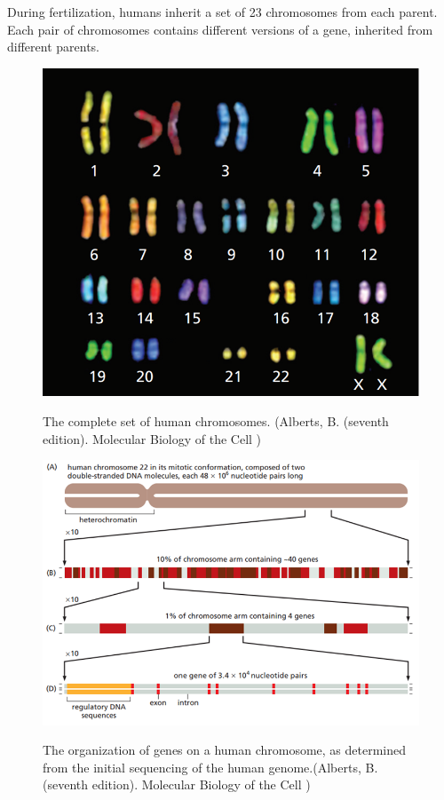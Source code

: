 \documentclass[12pt]{article}
\begin{document}
During fertilization, humans inherit a set of 23 chromosomes from each parent. Each pair of chromosomes contains different versions of a gene, inherited from different parents.\\[6px]

\begin{figure}[H] 
\centering 
\includegraphics[scale=0.75]{Picture1}\\
\caption{The complete set of human chromosomes. (Alberts, B. (seventh edition). Molecular Biology of the Cell
)}
\end{figure} 

\begin{figure}[H]
\centering
\includegraphics[scale=0.85]{Picture2}\\
\caption{The organization of genes on a human chromosome, as determined from the initial sequencing of the human genome.(Alberts, B. (seventh edition). Molecular Biology of the Cell
)}
\end{figure}
\end{document}
